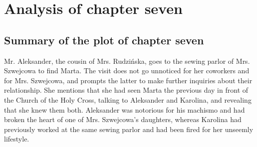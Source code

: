 \section{Analysis of chapter seven}

\subsection{Summary of the plot of chapter seven}

Mr. Aleksander, the cousin of Mrs. Rudzińska, goes to the sewing parlor of Mrs. Szwejcowa to find Marta.
The visit does not go unnoticed for her coworkers and for Mrs. Szwejcowa, and prompts the latter to make further inquiries about their relationship.
She mentions that she had seen Marta the previous day in front of the Church of the Holy Cross, talking to Aleksander and Karolina, and revealing that she knew them both.
Aleksander was notorious for his machismo and had broken the heart of one of Mrs. Szwejcowa's daughters, whereas Karolina had previously worked at the same sewing parlor and had been fired for her unseemly lifestyle.